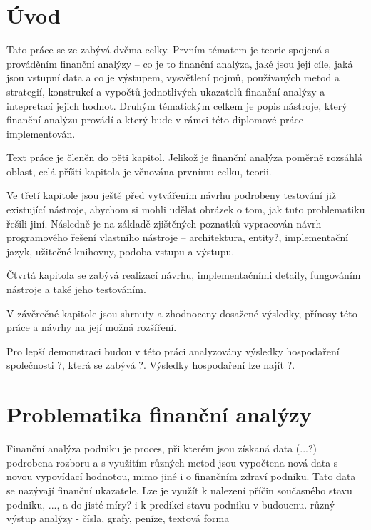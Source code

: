 \chapter{Úvod}
Tato práce se ze zabývá dvěma celky. Prvním tématem je teorie spojená s prováděním finanční analýzy -- co je to finanční analýza, jaké jsou její cíle, jaká jsou vstupní data a co je výstupem, vysvětlení pojmů, používaných metod a strategií, konstrukcí a vypočtů jednotlivých ukazatelů finanční analýzy a intepretací jejich hodnot. 
Druhým tématickým celkem je popis nástroje, který finanční analýzu provádí a který bude v rámci této diplomové práce implementován. 

Text práce je členěn do pěti kapitol. Jelikož je finanční analýza poměrně rozsáhlá oblast, celá příští kapitola je věnována prvnímu celku, teorii. 

Ve třetí kapitole jsou ještě před vytvářením návrhu podrobeny testování již existující nástroje, abychom si mohli udělat obrázek o tom, jak tuto problematiku řešili jiní. Následně je na základě zjištěných poznatků vypracován návrh programového řešení vlastního nástroje -- architektura, entity?, implementační jazyk, užitečné knihovny, podoba vstupu a výstupu.

Čtvrtá kapitola se zabývá realizací návrhu, implementačními detaily, fungováním nástroje a také jeho testováním. 

V závěrečné kapitole jsou shrnuty a zhodnoceny dosažené výsledky, přínosy této práce a návrhy na její možná rozšíření.

Pro lepší demonstraci budou v této práci analyzovány výsledky hospodaření společnosti ?, která se zabývá ?. Výsledky hospodaření lze najít ?.



























\chapter{Problematika finanční analýzy}


Finanční analýza podniku je proces, při kterém jsou získaná data (...?) podrobena rozboru a s využitím různých metod jsou vypočtena nová data s novou vypovídací hodnotou, mimo jiné i o finančním zdraví podniku. Tato data se nazývají finanční ukazatele. Lze je využít k nalezení příčin současného stavu podniku, ..., a do jisté míry? i k predikci stavu podniku v budoucnu.
různý výstup analýzy - čísla, grafy, peníze, textová forma

